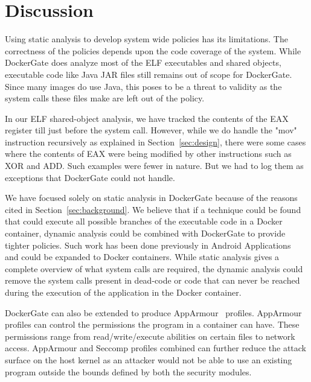 \section{Discussion}
\label{sec:discussion}
Using static analysis to develop system wide policies has its limitations. The correctness of the policies depends upon the code coverage of the system. While DockerGate does analyze most of the ELF executables and shared objects, executable code like Java JAR files still remains out of scope for DockerGate. Since many images do use Java, this poses to be a threat to validity as the system calls these files make are left out of the policy.

In our ELF shared-object analysis, we have tracked the contents of the EAX register till just before the system call. However, while we do handle the "mov" instruction recursively as explained in Section~\ref{sec:design}, there were some cases where the contents of EAX were being modified by other instructions such as XOR and ADD. Such examples were fewer in nature. But we had to log them as exceptions that DockerGate could not handle.

We have focused solely on static analysis in DockerGate because of the reasons cited in 
Section~\ref{sec:background}. We believe that if a technique could be found that could execute all possible branches of the executable code in a Docker container, dynamic analysis could be combined with DockerGate to provide tighter policies. Such work has been done previously in Android Applications~\cite{monkeyrunner} and could be expanded to Docker containers. While static analysis gives a complete overview of what system calls are required, the dynamic analysis could remove the system calls present in dead-code or code that can never be reached during the execution of the application in the Docker container.

DockerGate can also be extended to produce AppArmour~\cite{apparmor} profiles. AppArmour profiles can control the permissions the program in a container can have. These permissions range from read/write/execute abilities on certain files to network access. AppArmour and Seccomp profiles combined can further reduce the attack surface on the host kernel as an attacker would not be able to use an existing program outside the bounds defined by both the security modules.

